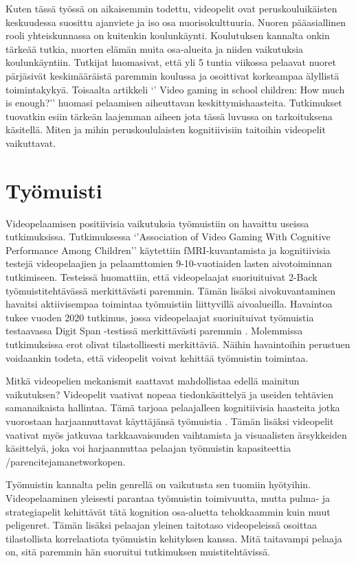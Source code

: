 \documentclass[utf8,bachelor]{gradu3}
\begin{document}
Kuten tässä työssä on aikaisemmin todettu, videopelit ovat peruskouluikäisten keskuudessa suosittu ajanviete ja iso osa nuorisokulttuuria. Nuoren pääasiallinen rooli yhteiskunnassa on kuitenkin koulunkäynti. Koulutuksen kannalta onkin tärkeää tutkia, nuorten elämän muita osa-alueita ja niiden vaikutuksia koulunkäyntiin. Tutkijat \parencite{kovess2016time} huomasivat, että yli 5 tuntia viikossa pelaavat nuoret pärjäsivät keskimääräistä paremmin koulussa ja osoittivat korkeampaa älyllistä toimintakykyä. Toisaalta artikkeli ‘’ Video gaming in school children: How much is enough?’’ \parencite{pujol2016video} huomasi pelaamisen aiheuttavan keskittymishaasteita. Tutkimukset tuovatkin esiin tärkeän laajemman aiheen jota tässä luvussa on tarkoituksena käsitellä. Miten ja mihin peruskoululaisten kognitiivisiin taitoihin videopelit vaikuttavat.  

\section{Työmuisti}
Videopelaamisen positiivisia vaikutuksia työmuistiin on havaittu useissa tutkimuksissa. Tutkimuksessa ‘’Association of Video Gaming With Cognitive Performance Among Children’’ \parencite{jamanetworkopen} käytettiin fMRI-kuvantamista ja kognitiivisia testejä videopelaajien ja pelaamttomien 9-10-vuotiaiden lasten aivotoiminnan tutkimiseen. Testeissä huomattiin, että videopelaajat suoriuituivat 2-Back työmuistitehtävässä merkittävästi paremmin. Tämän lisäksi aivokuvantaminen havaitsi aktiivisempaa toimintaa työmuistiin liittyvillä aivoalueilla. Havaintoa tukee vuoden 2020 tutkimus, jossa videopelaajat suoriuituivat työmuistia testaavassa Digit Span -testissä merkittävästi paremmin \parencite{choudhury2022cognitive}. Molemmissa tutkimuksissa erot olivat tilastollisesti merkittäviä. Näihin havaintoihin perustuen voidaankin todeta, että videopelit voivat kehittää työmuistin toimintaa. 

Mitkä videopelien mekanismit saattavat mahdollistaa edellä mainitun vaikutuksen? Videopelit vaativat nopeaa tiedonkäsittelyä ja useiden tehtävien samanaikaista hallintaa. Tämä tarjoaa pelaajalleen kognitiivisia haasteita jotka vuorostaan harjaannuttavat käyttäjänsä työmuistia \parencite{choudhury2022cognitive}. Tämän lisäksi videopelit vaativat myös jatkuvaa tarkkaavaisuuden vaihtamista ja visuaalisten ärsykkeiden käsittelyä, joka voi harjaannuttaa pelaajan työmuistin kapasiteettia /parencite{jamanetworkopen}.  

Työmuistin kannalta pelin genrellä on vaikutusta sen tuomiin hyötyihin. Videopelaaminen yleisesti parantaa työmuistin toimivuutta, mutta pulma- ja strategiapelit kehittävät tätä kognition osa-aluetta tehokkaammin kuin muut peligenret.  Tämän lisäksi pelaajan yleinen taitotaso videopeleissä osoittaa tilastollista korrelaatiota työmuistin kehityksen kanssa. Mitä taitavampi pelaaja on, sitä paremmin hän suoruitui tutkimuksen muistitehtävissä. \textcite {zioga2024validation} 
\end{document}
